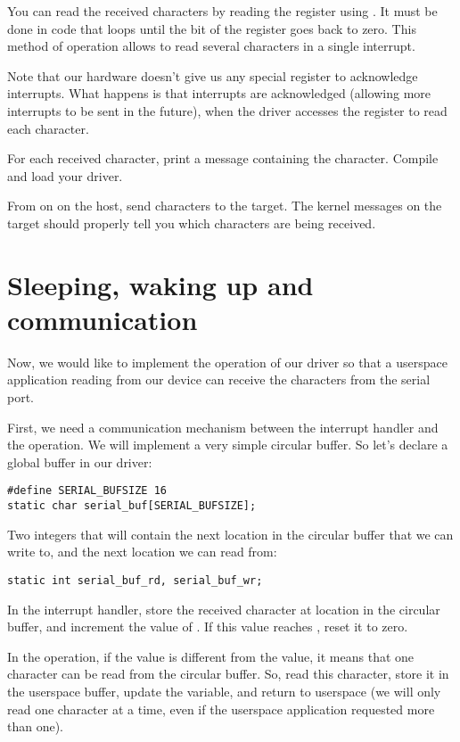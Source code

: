 You can read the received characters by reading the 
register using . It must be done in code that loops until the
 bit of the  register goes back to
zero. This method of operation allows to read several characters in a
single interrupt.

Note that our hardware doesn't give us any special register to
acknowledge interrupts. What happens is that interrupts are
acknowledged (allowing more interrupts to be sent in the future), when
the driver accesses the  register to read each
character.

For each received character, print a message containing the character.
Compile and load your driver.

From  on  on the host, send characters
to the target. The kernel messages on the target should properly tell
you which characters are being received.

\section{Sleeping, waking up and communication}

Now, we would like to implement the  operation of our
driver so that a userspace application reading from our device can
receive the characters from the serial port.

First, we need a communication mechanism between the interrupt handler
and the  operation. We will implement a very simple
circular buffer. So let's declare a global buffer in our driver:

\begin{verbatim}
#define SERIAL_BUFSIZE 16
static char serial_buf[SERIAL_BUFSIZE];
\end{verbatim}

Two integers that will contain the next location in the circular
buffer that we can write to, and the next location we can read from:

\begin{verbatim}
static int serial_buf_rd, serial_buf_wr;
\end{verbatim}

In the interrupt handler, store the received character at location
 in the circular buffer, and increment the value
of . If this value reaches ,
reset it to zero.

In the  operation, if the  value is
different from the  value, it means that one
character can be read from the circular buffer. So, read this
character, store it in the userspace buffer, update the
 variable, and return to userspace (we will only
read one character at a time, even if the userspace application
requested more than one).

